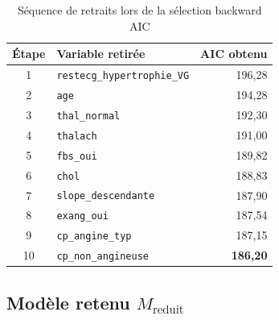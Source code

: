 \documentclass[11pt,a4paper,twoside]{report}
\theoremstyle{definition}
\begin{document}
\begin{table}[H]
\centering
\caption{Séquence de retraits lors de la sélection backward AIC}
\label{tab:backward}
\small
\begin{tabular}{clr}
\toprule
Étape & Variable retirée & AIC obtenu \\
\midrule
1  & \texttt{restecg\_hypertrophie\_VG} & 196,28 \\
2  & \texttt{age}                        & 194,28 \\
3  & \texttt{thal\_normal}               & 192,30 \\
4  & \texttt{thalach}                    & 191,00 \\
5  & \texttt{fbs\_oui}                   & 189,82 \\
6  & \texttt{chol}                       & 188,83 \\
7  & \texttt{slope\_descendante}         & 187,90 \\
8  & \texttt{exang\_oui}                 & 187,54 \\
9  & \texttt{cp\_angine\_typ}            & 187,15 \\
10 & \texttt{cp\_non\_angineuse}         & \textbf{186,20} \\
\bottomrule
\end{tabular}
\end{table}

\subsection{Modèle retenu $M_{\text{reduit}}$}
\end{document}
